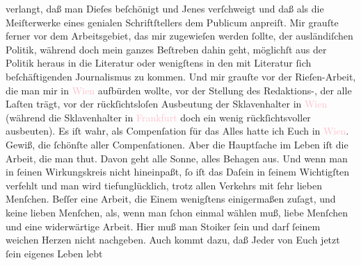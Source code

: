                verlangt, daß man Dieſes beſchönigt und Jenes verſchweigt und daß \label{K_L02868-3v}\label{K_L02868-3h} als die {\pb}Meiſterwerke
               eines genialen Schriftſtellers dem Publicum anpreiſt.  Mir grauſte ferner vor dem Arbeitsgebiet, das mir zugewieſen werden
               ſollte, der ausländiſchen Politik, während doch mein ganzes Beſtreben dahin geht,
               möglichſt aus der Politik heraus in die Literatur oder wenigſtens in den mit
               Literatur ſich beſchäftigenden Journalismus zu kommen. Und mir grauſte vor der
               Rieſen-Arbeit, die man mir in \textcolor{pink}{Wien}{}\ledrightnote{\textcolor{pink}{Wien}} aufbürden
               wollte, vor der Stellung des Redaktions-\label{K_L02868-4v}\label{K_L02868-4h}, der alle Laſten trägt,
               vor der rückſichtsloſen Ausbeutung der Sklavenhalter in \textcolor{pink}{Wien}{}\ledrightnote{\textcolor{pink}{Wien}} (während die Sklavenhalter in \textcolor{pink}{Frankfurt}{}\ledrightnote{\textcolor{pink}{Frankfurt am Main}} doch ein wenig  rückſichtsvoller ausbeuten). Es iſt wahr, als Compenſation für das Alles hatte
               ich Euch in \textcolor{pink}{Wien}{}\ledrightnote{\textcolor{pink}{Wien}}.  Gewiß, die ſchönſte aller Compenſationen. Aber  die Hauptſache im Leben iſt die Arbeit, die man thut. Davon geht alle
               Sonne, alles Behagen aus. Und wenn man in ſeinen Wirkungskreis nicht hineinpaßt, ſo
               iſt das Daſein in ſeinem Wichtigſten verfehlt und man wird tiefunglücklich, trotz
               allen Verkehrs {\pb}mit ſehr lieben Menſchen. Beſſer
               eine Arbeit, die Einem wenigſtens einigermaßen zuſagt, und keine lieben Menſchen,
               als, wenn man ſchon einmal wählen muß, liebe Menſchen und eine widerwärtige Arbeit.
                  \introOben{}Hier muß man Stoiker ſein und darf ſeinem weichen Herzen nicht
                  nachgeben.\introOben{} Auch kommt dazu, daß Jeder von Euch jetzt ſein eigenes Leben lebt
